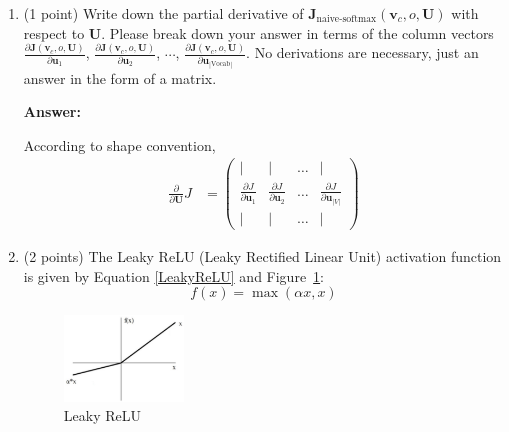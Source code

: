 \documentclass{article}
\newenvironment{answer}{
    {\bf Answer:} \sf \begingroup\color{red}
}{\endgroup}%
\begin{document}
\begin{enumerate}[label=(\alph*)]
\begin{shaded}
\begin{answer}
Here I use shape convention,
\begin{align}
    \frac{\partial }{\partial \bm u_w} J 
    &= - y_w\bm v_c + \frac{\exp(\bm u_{w}^\top \bm v_c) \bm v_{c}}{\sum_{w} \exp(\bm u_{w}^\top \bm v_c)}
    = (\hat{y}_w - y_w)\bm v_c.
\end{align}
When $w\neq o$ second term $y_w = 0$.
\end{answer}
\end{shaded}

\item (1 point) Write down the partial derivative of $\bm J_{\text{naive-softmax}}(\bm v_c, o, \bm U)$ with respect to $\bm U$. Please break down your answer in terms of the column vectors $\frac{\partial \bm J(\bm v_c, o, \bm U)}{\partial \bm u_1}$, $\frac{\partial \bm J(\bm v_c, o, \bm U)}{\partial \bm u_2}$, $\cdots$, $\frac{\partial \bm J(\bm v_c, o, \bm U)}{\partial \bm u_{|\text{Vocab}|}}$. No derivations are necessary, just an answer in the form of a matrix.

\begin{shaded}
\begin{answer}
According to shape convention, 
\begin{align}
    \frac{\partial }{\partial \bm U} J &=
    \begin{pmatrix}
        \vert	&	\vert	&	\dots	&	\vert	\\
        \frac{\partial J}{\partial \bm u_1}	&	\frac{\partial J}{\partial \bm u_2}	&	\dots	&	\frac{\partial J}{\partial \bm u_{|V|}}	\\
        \vert	&	\vert	&	\dots	&	\vert	
    \end{pmatrix}
\end{align}
\end{answer}
\end{shaded}

\item (2 points) The Leaky ReLU (Leaky Rectified Linear Unit) activation function is given by Equation \ref{LeakyReLU} and Figure~\ref{fig:leaky_relu}:
\begin{equation}
    \label{LeakyReLU}
    f(x) = \max(\alpha x, x)
\end{equation}

\begin{figure}[h]
    \centering
    \includegraphics[width=0.3\textwidth]{leaky_relu_graph.png}
    \caption{Leaky ReLU}
    \label{fig:leaky_relu}
\end{figure}


\end{enumerate}
\end{document}
